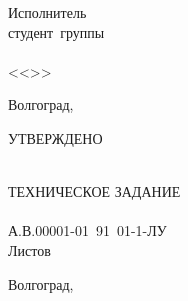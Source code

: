 {{\begin{flushleft}
\begin{minipage}[c]{15em}
\end{minipage}
\hfill
\begin{minipage}[c]{15em}
Исполнитель\\
студент\ группы\ \VSTUStudentGroup\\
\makebox[2cm]{\hrulefill}\VSTUStudentName\\
<<\makebox[1.5cm]{\hrulefill}>>\makebox[3.5cm]{\hrulefill}\the\year
\end{minipage}
\end{flushleft}
\vfill
\begin{center}
Волгоград,\ \the\year
\end{center}
\clearpage
\thispagestyle{empty}
УТВЕРЖДЕНО\\
\vspace{6cm}
\begin{center}
\VSTUTitle\\
\vspace{8mm}
ТЕХНИЧЕСКОЕ ЗАДАНИЕ\\
\VSTUDocumentCode{}\\
А.В.00001-01\ 91\ 01-1-ЛУ\\
Листов \totalpages\\
\vspace{15mm}
\end{center}
\vfill
\begin{center}
Волгоград,\ \the\year
\end{center}
}
}
